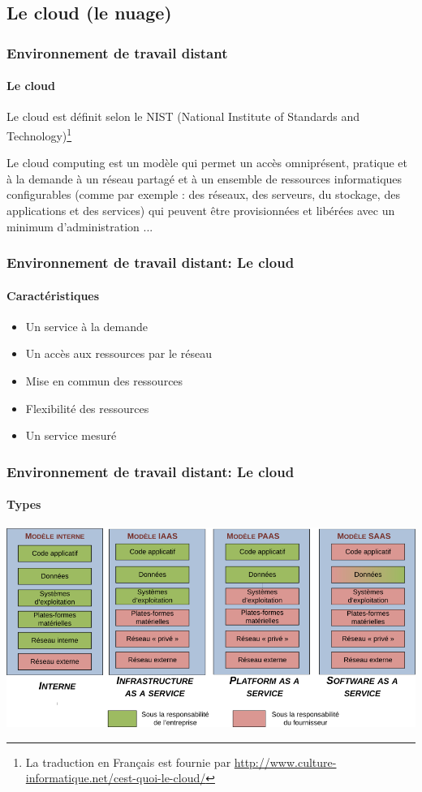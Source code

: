 \documentclass{beamer}
\begin{document}
\subsection{Le cloud (le nuage)}

\begin{frame}
\frametitle{Environnement de travail distant}
\framesubtitle{Le cloud}

Le cloud est définit selon le NIST (National Institute of Standards and Technology)\footnote{La traduction en Français est fournie par \url{http://www.culture-informatique.net/cest-quoi-le-cloud/}}
\begin{definition}
	Le cloud computing est un modèle qui permet un accès omniprésent, pratique et à la demande à un réseau partagé et à un ensemble de ressources informatiques configurables (comme par exemple : des réseaux, des serveurs, du stockage, des applications et des services) qui peuvent être provisionnées et libérées avec un minimum d’administration ...
\end{definition}

\end{frame}

\begin{frame}
\frametitle{Environnement de travail distant: Le cloud}
\framesubtitle{Caractéristiques}

\begin{itemize}
	\item Un service à la demande
	\item Un accès aux ressources par le réseau
	\item Mise en commun des ressources
	\item Flexibilité des ressources
	\item Un service mesuré
\end{itemize}


\end{frame}


\begin{frame}
\frametitle{Environnement de travail distant: Le cloud}
\framesubtitle{Types}

\includegraphics[width=
\textwidth]{../img/Bweb01-environnement/cloud-types.png}


\end{frame}
\end{document}
